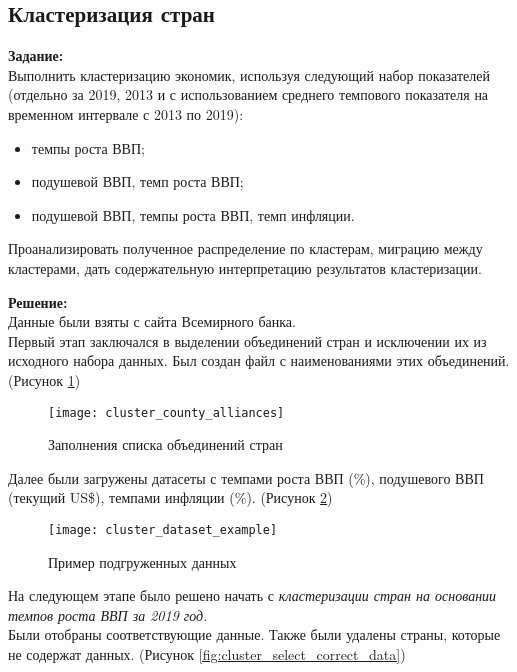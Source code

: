\subsection*{Кластеризация стран}

\textbf{Задание:}\\
Выполнить кластеризацию экономик, используя следующий набор показателей (отдельно за 2019, 2013 и с использованием среднего темпового показателя на временном интервале с 2013 по 2019):
\begin{itemize}[topsep=0pt,itemsep=-1ex,partopsep=1ex,parsep=1ex]
	\item темпы роста ВВП;
	\item подушевой ВВП, темп роста ВВП;
	\item подушевой ВВП, темпы роста ВВП, темп инфляции.
\end{itemize}

Проанализировать полученное распределение по кластерам, миграцию между кластерами, дать содержательную интерпретацию результатов кластеризации.

\textbf{Решение:}\\
Данные были взяты с сайта Всемирного банка.\\
Первый этап заключался в выделении объединений стран и исключении их из исходного набора данных. Был создан файл с наименованиями этих объединений. (Рисунок \ref{fig:cluster_county_alliances})
\begin{figure}[h]
	\centering \texttt{[image: cluster\_county\_alliances]}
	\caption{Заполнения списка объединений стран}
	\label{fig:cluster_county_alliances}
\end{figure}

Далее были загружены датасеты с темпами роста ВВП (\%), подушевого ВВП (текущий US\$), темпами инфляции (\%). (Рисунок \ref{fig:cluster_dataset_example})
\begin{figure}[h]
	\centering \texttt{[image: cluster\_dataset\_example]}
	\caption{Пример подгруженных данных}
	\label{fig:cluster_dataset_example}
\end{figure}

\newpage

На следующем этапе было решено начать с \textit{кластеризации стран на основании темпов роста ВВП за 2019 год}.\\

Были отобраны соответствующие данные. Также были удалены страны, которые не содержат данных. (Рисунок \ref{fig:cluster_select_correct_data})

